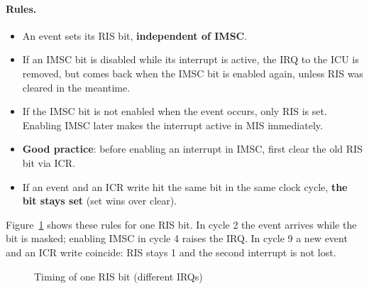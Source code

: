 \paragraph{Rules.}
\begin{itemize}
  \item An event sets its RIS bit, \textbf{independent of IMSC}.
  \item If an IMSC bit is disabled while its interrupt is active, the IRQ to the
    ICU is removed, but comes back when the IMSC bit is enabled again, unless
    RIS was cleared in the meantime.
  \item If the IMSC bit is not enabled when the event occurs, only RIS is set.
    Enabling IMSC later makes the interrupt active in MIS immediately.
  \item \textbf{Good practice}: before enabling an interrupt in IMSC, first clear
    the old RIS bit via ICR.
  \item If an event and an ICR write hit the same bit in the same clock cycle,
    \textbf{the bit stays set} (set wins over clear).
\end{itemize}

Figure~\ref{fig:archirq04} shows these rules for one RIS bit. In cycle 2 the
event arrives while the bit is masked; enabling IMSC in cycle 4 raises the IRQ.
In cycle 9 a new event and an ICR write coincide: RIS stays 1 and the second
interrupt is not lost.

\begin{figure}[H]
\centering
{}
\caption{Timing of one RIS bit (different IRQs)}
\label{fig:archirq04}
\end{figure}

